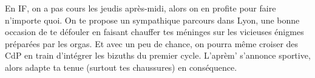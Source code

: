 En IF, on a pas cours les jeudis après-midi, alors on en profite pour faire
n'importe quoi. On te propose un sympathique parcours dans Lyon, une bonne occasion de te
défouler en faisant chauffer tes méninges sur les vicieuses énigmes préparées
par les orgas. Et avec un peu de chance, on pourra même croiser des CdP en
train d'intégrer les bizuths du premier cycle.
L'aprèm' s'annonce sportive, alors adapte ta tenue (surtout tes chaussures) en
conséquence. 
